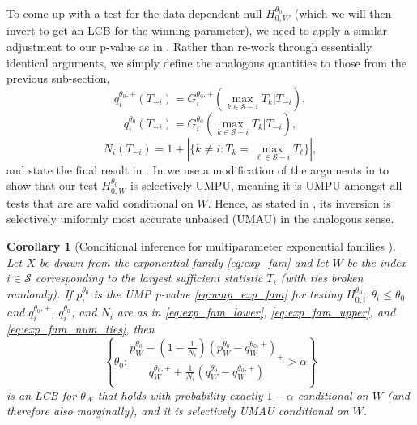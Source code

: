 \documentclass{article}
\newtheorem{corollary}{Corollary}
\begin{document}
To come up with a test for the data dependent null $H_{0, W}^{\theta_0}$ (which we will then invert to get an LCB for the winning parameter), we need to apply a similar adjustment to our p-value as in . Rather than re-work through essentially identical arguments, we simply define the analogous quantities to those from the previous sub-section,
\begin{equation}
    \label{eq:exp_fam_lower}
    q^{\theta_0, +}_i(T_{-i}) = G^{\theta_0, +}_i(\max_{k \in \mathcal{S} - i } T_k | T_{-i}), 
\end{equation} 
\begin{equation}
    \label{eq:exp_fam_upper}
    q^{\theta_0}_i(T_{-i}) = G^{\theta_0}_i(\max_{k \in \mathcal{S} - i } T_k | T_{-i}),
\end{equation} 
\begin{equation}
    \label{eq:exp_fam_num_ties}
    N_i(T_{-i}) = 1 + | \{k \neq i: T_k = \max_{\ell \in \mathcal{S} - i} T_\ell \}|,
\end{equation}
and state the final result in . In  we use a modification of the arguments in \cite{Fithian2017} to show that our test $H^{\theta_0}_{0, W}$ is selectively UMPU, meaning it is UMPU amongst all tests that are are valid conditional on $W$. Hence, as stated in , its inversion is selectively uniformly most accurate unbaised (UMAU) in the analogous sense. 

\begin{corollary}[Conditional inference for multiparameter exponential families ]
    \label{cor:cond_exp_fam}
    Let $X$ be drawn from the exponential family \eqref{eq:exp_fam} and let $W$ be the index $i \in \mathcal{S}$ corresponding to the largest sufficient statistic $T_i$ (with ties broken randomly). If $p^{\theta_0}_i$ is the UMP p-value \eqref{eq:ump_exp_fam} for testing $H^{\theta_0}_{0, i} : \theta_i \leq \theta_0 $ and $q^{\theta_0, +}_i$, $q^{\theta_0}_i$, and $N_i$ are as in \eqref{eq:exp_fam_lower}, \eqref{eq:exp_fam_upper}, and \eqref{eq:exp_fam_num_ties}, then 
    \begin{equation}
    \label{eq:cond_lcb_exp_fam}
    \left\{\theta_0 :  \frac{p^{\theta_0}_W - \left(1 - \frac{1}{N_i} \right)(p^{\theta_0}_W - q^{\theta_0, +}_W)_+ }{q^{\theta_0, +}_W + \frac{1}{N_i}(q^{\theta_0}_W - q^{\theta_0, +}_W) } > \alpha \right\} 
    \end{equation}
    is an LCB for $\theta_W$ that holds with probability exactly $1-\alpha$ conditional on $W$ (and therefore also marginally), and it is selectively UMAU conditional on $W$.
\end{corollary}
\end{document}
